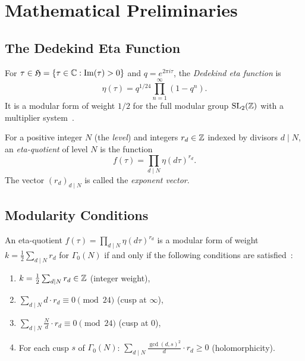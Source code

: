 \section{Mathematical Preliminaries}
\label{sec:math_prelim}

\subsection{The Dedekind Eta Function}

\begin{definition}
\label{def:dedekind_eta}
For $\tau \in \mathfrak{H} = \{\tau \in \mathbb{C} : \mathrm{Im}(\tau) > 0\}$
and $q = e^{2\pi i \tau}$, the \emph{Dedekind eta function} is
\begin{equation}
  \eta(\tau) = q^{1/24} \prod_{n=1}^{\infty} (1 - q^n).
\end{equation}
It is a modular form of weight $1/2$ for the full modular group
$\mathrm{SL}_2(\mathbb{Z})$ with a multiplier system~\cite{ono2004}.
\end{definition}

\begin{definition}
\label{def:eta_quotient}
For a positive integer $N$ (the \emph{level}) and integers
$r_d \in \mathbb{Z}$ indexed by divisors $d \mid N$, an
\emph{eta-quotient} of level $N$ is the function
\begin{equation}
  \label{eq:eta_quotient}
  f(\tau) = \prod_{d \mid N} \eta(d\tau)^{r_d}.
\end{equation}
The vector $(r_d)_{d \mid N}$ is called the
\emph{exponent vector}.
\end{definition}

\subsection{Modularity Conditions}

An eta-quotient $f(\tau) = \prod_{d \mid N} \eta(d\tau)^{r_d}$
is a modular form of weight $k = \frac{1}{2}\sum_{d \mid N} r_d$
for $\Gamma_0(N)$ if and only if the following conditions are
satisfied~\cite{ono2004,martin_1996}:
\begin{enumerate}[label=(M\arabic*)]
  \item $k = \frac{1}{2}\sum_{d \mid N} r_d \in \mathbb{Z}$
        \hfill (integer weight),
  \item $\sum_{d \mid N} d \cdot r_d \equiv 0 \pmod{24}$
        \hfill (cusp at $\infty$),
  \item $\sum_{d \mid N} \frac{N}{d} \cdot r_d \equiv 0 \pmod{24}$
        \hfill (cusp at $0$),
  \item For each cusp $s$ of $\Gamma_0(N)$:
        $\sum_{d \mid N} \frac{\gcd(d,s)^2}{d} \cdot r_d \geq 0$
        \hfill (holomorphicity).
\end{enumerate}

